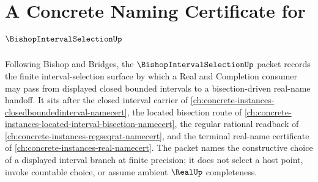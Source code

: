 \chapter{A Concrete Naming Certificate for $\BishopIntervalSelectionUp$}
\label{ch:concrete-instances-bishop-interval-selection-namecert}

Following Bishop and Bridges, the $\BishopIntervalSelectionUp$ packet records the finite interval-selection surface by which a Real and Completion consumer may pass from displayed closed bounded intervals to a bisection-driven real-name handoff. It sits after the closed interval carrier of \autoref{ch:concrete-instances-closedboundedinterval-namecert}, the located bisection route of \autoref{ch:concrete-instances-located-interval-bisection-namecert}, the regular rational readback of \autoref{ch:concrete-instances-regseqrat-namecert}, and the terminal real-name certificate of \autoref{ch:concrete-instances-real-namecert}. The packet names the constructive choice of a displayed interval branch at finite precision; it does not select a host point, invoke countable choice, or assume ambient $\RealUp$ completeness.

